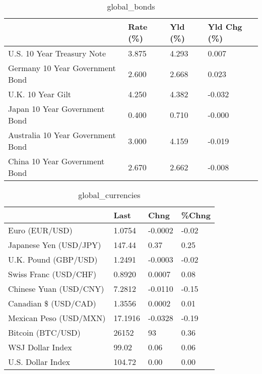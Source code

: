 \documentclass{article}%
\begin{document}
%


\begin{table}[htbp]%
\caption{global\_bonds}%
\centering%
\begin{adjustbox}{width=1\textwidth}%
\begin{tabular}{llll}
\toprule
                                  & Rate (\%) & Yld (\%) & Yld Chg (\%) \\
\midrule
       U.S. 10 Year Treasury Note &    3.875 &   4.293 &       0.007 \\
  Germany 10 Year Government Bond &    2.600 &   2.668 &       0.023 \\
                U.K. 10 Year Gilt &    4.250 &   4.382 &      -0.032 \\
    Japan 10 Year Government Bond &    0.400 &   0.710 &      -0.000 \\
Australia 10 Year Government Bond &    3.000 &   4.159 &      -0.019 \\
    China 10 Year Government Bond &    2.670 &   2.662 &      -0.008 \\
\bottomrule
\end{tabular}
%
\end{adjustbox}%
\end{table}

%


\begin{table}[htbp]%
\caption{global\_currencies}%
\centering%
\begin{adjustbox}{width=1\textwidth}%
\begin{tabular}{llll}
\toprule
                       &    Last &    Chng & \%Chng \\
\midrule
        Euro (EUR/USD) &  1.0754 & -0.0002 & -0.02 \\
Japanese Yen (USD/JPY) &  147.44 &    0.37 &  0.25 \\
  U.K. Pound (GBP/USD) &  1.2491 & -0.0003 & -0.02 \\
 Swiss Franc (USD/CHF) &  0.8920 &  0.0007 &  0.08 \\
Chinese Yuan (USD/CNY) &  7.2812 & -0.0110 & -0.15 \\
  Canadian \$ (USD/CAD) &  1.3556 &  0.0002 &  0.01 \\
Mexican Peso (USD/MXN) & 17.1916 & -0.0328 & -0.19 \\
     Bitcoin (BTC/USD) &   26152 &      93 &  0.36 \\
      WSJ Dollar Index &   99.02 &    0.06 &  0.06 \\
     U.S. Dollar Index &  104.72 &    0.00 &  0.00 \\
\bottomrule
\end{tabular}
%
\end{adjustbox}%
\end{table}
\end{document}

